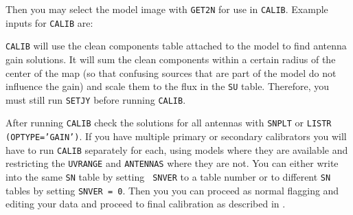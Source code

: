 Then you may select the model image with {\tt GET2N} for use in
{\tt CALIB}\@.  Example inputs for {\tt CALIB} are:

{\tt CALIB} will use the clean components table attached to the model
to find antenna gain solutions.  It will sum the clean components
within a certain radius of the center of the map (so that confusing
sources that are part of the model do not influence the gain) and
scale them to the flux in the {\tt SU} table. Therefore, you must
still run {\tt SETJY} before running {\tt CALIB}.

After running {\tt CALIB} check the solutions for all antennas with
{\tt SNPLT} or {\tt LISTR (OPTYPE='GAIN')}.  If you have multiple
primary or secondary calibrators you will have to run {\tt CALIB}
separately for each, using models where they are available and
restricting the {\tt UVRANGE} and {\tt ANTENNAS} where they are not.
You can either write into the same {\tt SN} table by setting {\tt
SNVER} to a table number or to different {\tt SN} tables by setting
{\tt SNVER = 0}. Then you you can proceed as normal flagging and
editing your data and proceed to final calibration as described in
.

